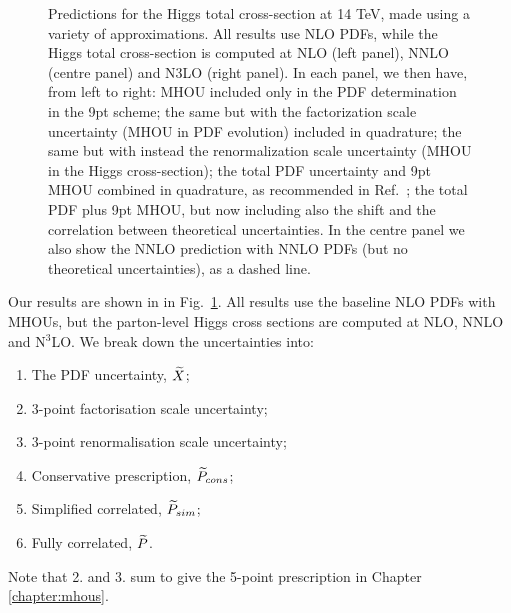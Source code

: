 \begin{figure}[h]
    \begin{center}
    \end{center}
  \vspace{-0.55cm}
  \caption{Predictions for the Higgs total cross-section at 14 TeV, made using a variety of approximations. All results use NLO PDFs, while the Higgs total cross-section is computed at NLO (left panel), NNLO (centre panel) and N3LO (right panel). In each panel, we then have, from left to right: MHOU included only in the PDF determination in the 9pt scheme; the same but with the factorization scale uncertainty (MHOU in PDF evolution) included in quadrature; the same but with instead the renormalization scale uncertainty (MHOU in the Higgs cross-section); the total PDF uncertainty and 9pt MHOU combined in quadrature, as recommended in Ref.~\cite{AbdulKhalek:2019ihb}; the total PDF plus 9pt MHOU, but now including also the shift and the correlation between theoretical uncertainties. In the centre panel we also show the NNLO prediction with NNLO PDFs (but no theoretical uncertainties), as a dashed line. }
  \label{fig:Higgs}
\end{figure}

Our results are shown in in Fig.~\ref{fig:Higgs}. All results use the baseline NLO PDFs with MHOUs, but the parton-level Higgs cross sections are computed at NLO, NNLO and N$^3$LO. We break down the uncertainties into: 
\begin{enumerate}
\item The PDF uncertainty, $\widetilde{X}$;
\item 3-point factorisation scale uncertainty; 
\item 3-point renormalisation scale uncertainty;
\item Conservative prescription, $\widetilde{P}_{cons}$;
\item Simplified correlated, $\widetilde{P}_{sim}$;
\item Fully correlated, $\widetilde{P}$.
\end{enumerate}
Note that 2. and 3. sum to give the 5-point prescription in Chapter \ref{chapter:mhous}. 

